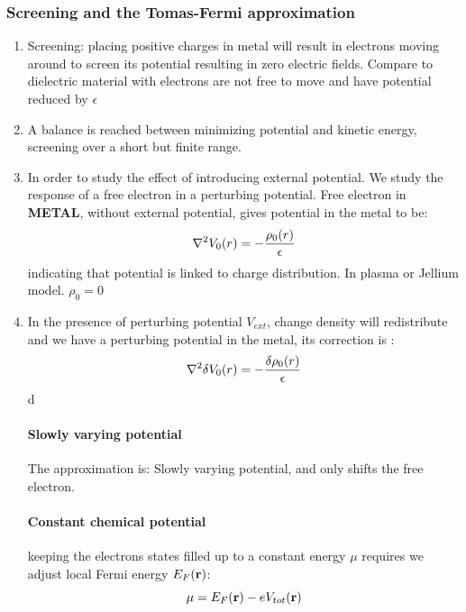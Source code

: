 \documentclass[12pt,a4paper]{article}
\begin{document}
        \subsubsection{Screening and the Tomas-Fermi approximation}
            \begin{enumerate}
                \item Screening: placing positive charges in metal will result in electrons moving around to screen its potential resulting in zero electric fields. Compare to dielectric material with electrons are not free to move and have potential reduced by $\epsilon$
                \item A balance is reached between minimizing potential and kinetic energy, screening over a short but finite range.
                \item In order to study the effect of introducing external potential. We study the response of a free electron in a perturbing potential. Free electron in \textbf{METAL}, without external potential, gives potential in the metal to be:
                \begin{equation}
                    \laplacian {V_0}(r) = - \frac{\rho_0(r)}{\epsilon}
                \end{equation}
                indicating that potential is linked to charge distribution. In plasma or Jellium model. $\rho_0 =0$
                \item In the presence of perturbing potential $V_{ext}$, change density will redistribute and we have a perturbing potential in the metal, its correction is :
                \begin{equation}
                    \laplacian \delta{V_0}(r) = - \frac{\delta \rho_0(r)}{\epsilon}
                \end{equation}d
                \paragraph*{Slowly varying potential} 
                The approximation is: Slowly varying potential, and only shifts the free electron.
                \paragraph*{Constant chemical potential}
                keeping the electrons states filled up to a constant energy $\mu$ requires we adjust local Fermi energy $E_F(\vb{r})$:
                \begin{equation}
                    \mu = E_F(\vb{r}) - e V_{tot}(\vb{r})
                \end{equation}

\end{enumerate}
\end{document}
